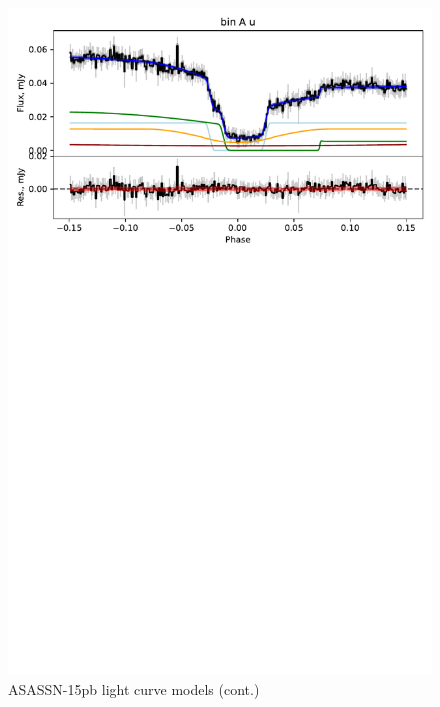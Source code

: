 \begin{figure}
    \centering
    \includegraphics[width=\textwidth, trim={0cm 17cm 0cm 0cm}, clip]{figures/results/ASASSN-15pb/ASASSN-15pb_2.pdf}
    \caption{ASASSN-15pb light curve models (cont.)}
    \label{fig:ASASSN-15pb all light curves cont 1}
\end{figure}
